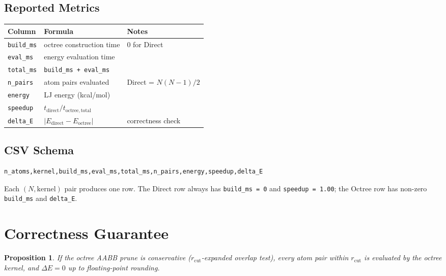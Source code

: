 \documentclass[11pt,a4paper]{article}
\theoremstyle{definition}
\theoremstyle{plain}
\newtheorem{proposition}[definition]{Proposition}
\newcommand{\rcut}{r_{\mathrm{cut}}}
\begin{document}
\subsection{Reported Metrics}

\begin{center}
\begin{tabular}{lll}
\toprule
Column & Formula & Notes \\
\midrule
\texttt{build\_ms}   & octree construction time  & 0 for Direct \\
\texttt{eval\_ms}    & energy evaluation time    & \\
\texttt{total\_ms}   & \texttt{build\_ms + eval\_ms} & \\
\texttt{n\_pairs}    & atom pairs evaluated      & Direct = $N(N-1)/2$ \\
\texttt{energy}      & LJ energy (kcal/mol)      & \\
\texttt{speedup}     & $t_{\mathrm{direct}} / t_{\mathrm{octree,total}}$ & \\
\texttt{delta\_E}    & $|E_{\mathrm{direct}} - E_{\mathrm{octree}}|$ & correctness check \\
\bottomrule
\end{tabular}
\end{center}

\subsection{CSV Schema}

\begin{lstlisting}[language={},basicstyle=\ttfamily\footnotesize]
n_atoms,kernel,build_ms,eval_ms,total_ms,n_pairs,energy,speedup,delta_E
\end{lstlisting}

Each $(N, \text{kernel})$ pair produces one row.
The Direct row always has \texttt{build\_ms = 0} and \texttt{speedup = 1.00};
the Octree row has non-zero \texttt{build\_ms} and \texttt{delta\_E}.

\section{Correctness Guarantee}
\label{sec:correctness}

\begin{proposition}
  If the octree AABB prune is conservative ($\rcut$-expanded overlap test),
  every atom pair within $\rcut$ is evaluated by the octree kernel, and
  $\Delta E = 0$ up to floating-point rounding.
\end{proposition}
\end{document}
